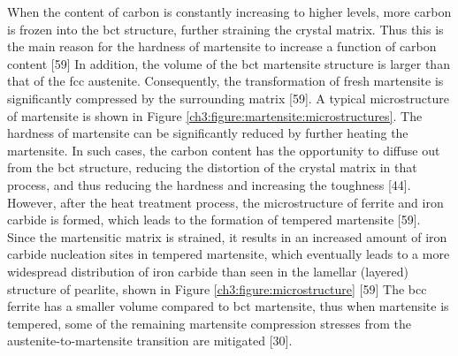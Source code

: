\documentclass[12pt]{report}
\begin{document}
When the content of carbon is constantly increasing to higher levels, more carbon is frozen into the bct structure, further straining the crystal matrix. Thus this is the main reason for the hardness of martensite to increase a function of carbon content [59] In addition, the volume of the bct martensite structure is larger than that of the fcc austenite. Consequently, the transformation of fresh martensite is significantly compressed by the surrounding matrix [59]. A typical microstructure of martensite is shown in Figure \ref{ch3:figure:martensite:microstructures}.
The hardness of martensite can be significantly reduced by further heating the martensite. In such cases, the carbon content has the opportunity to diffuse out from the bct structure, reducing the distortion of the crystal matrix in that process, and thus reducing the hardness and increasing the toughness [44]. However, after the heat treatment process, the microstructure of ferrite and iron carbide is formed, which leads to the formation of tempered martensite [59]. Since the martensitic matrix is strained, it results in an increased amount of iron carbide nucleation sites in tempered martensite, which eventually leads to a more widespread distribution of iron carbide than seen in the lamellar (layered) structure of pearlite, shown in Figure \ref{ch3:figure:microstructure} [59] The bcc ferrite has a smaller volume compared to bct martensite, thus when martensite is tempered, some of the remaining martensite compression stresses from the austenite-to-martensite transition are mitigated [30].
\end{document}
